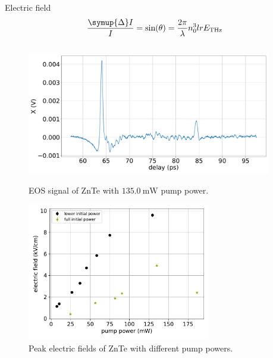 \documentclass[aspectratio=1610, 9pt]{beamer}
\begin{document}
\begin{frame}{Electric field}
  \begin{equation}
    \frac{\symup{\Delta}I}{I} = \text{sin}(\theta) = \frac{2\pi}{\lambda} n_0^3 l r E_\text{THz}
  \end{equation}
  \begin{columns}
    \begin{column}{.5\textwidth}
      \begin{center}
      \begin{figure}
        \centering
        \begin{overprint}
          \includegraphics[width=\textwidth]{images/2_11_30_20normalX.pdf}\caption{\textcolor{tugreen}{EOS signal} of ZnTe with $\SI{135.0}{\milli\W}$ pump power.}
          \includegraphics[width=0.75\textwidth]{images/eltric_field_ZnTe.pdf}\caption{\textcolor{tugreen}{Peak electric fields} of ZnTe with different pump powers.}
        \end{overprint}
      \end{figure}
    \end{center}
  \end{column}
  \begin{column}{.5\textwidth}

\end{column}
\end{columns}
\end{frame}
\end{document}
